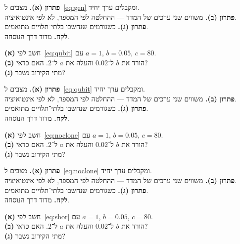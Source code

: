 \begin{keybox}[frametitle={פתרון 15},nobreak=true]
\textbf{פתרון (א).} מצבים ל~\eqref{eq:gen} ומקבלים ערך יחיד.\\[2pt]
\textbf{פתרון (ב).} משווים שני ערכים של המדד — ההחלטה לפי המספר, לא לפי אינטואיציה.\\[2pt]
\textbf{פתרון (ג).} כשגורמים שנחשבו בלתי־תלויים מתואמים.\\[2pt]
\textbf{לקח.} מדוד דרך הנוסחה.
\end{keybox}


\begin{exbox}[frametitle={תרגיל 16 — \en{Bloch}}]
\textbf{(א)} חשב לפי~\eqref{eq:qubit} עם $a=1$, $b=0.05$, $c=80$.\\[3pt]
\textbf{(ב)} הורד את $b$ ל־$0.02$ והעלה את $a$ ל־$2$. האם כדאי?\\[3pt]
\textbf{(ג)} מתי הקירוב נשבר?
\end{exbox}

\begin{keybox}[frametitle={פתרון 16},nobreak=true]
\textbf{פתרון (א).} מצבים ל~\eqref{eq:qubit} ומקבלים ערך יחיד.\\[2pt]
\textbf{פתרון (ב).} משווים שני ערכים של המדד — ההחלטה לפי המספר, לא לפי אינטואיציה.\\[2pt]
\textbf{פתרון (ג).} כשגורמים שנחשבו בלתי־תלויים מתואמים.\\[2pt]
\textbf{לקח.} מדוד דרך הנוסחה.
\end{keybox}


\begin{exbox}[frametitle={תרגיל 17 — \en{no-cloning}}]
\textbf{(א)} חשב לפי~\eqref{eq:noclone} עם $a=1$, $b=0.05$, $c=80$.\\[3pt]
\textbf{(ב)} הורד את $b$ ל־$0.02$ והעלה את $a$ ל־$2$. האם כדאי?\\[3pt]
\textbf{(ג)} מתי הקירוב נשבר?
\end{exbox}

\begin{keybox}[frametitle={פתרון 17},nobreak=true]
\textbf{פתרון (א).} מצבים ל~\eqref{eq:noclone} ומקבלים ערך יחיד.\\[2pt]
\textbf{פתרון (ב).} משווים שני ערכים של המדד — ההחלטה לפי המספר, לא לפי אינטואיציה.\\[2pt]
\textbf{פתרון (ג).} כשגורמים שנחשבו בלתי־תלויים מתואמים.\\[2pt]
\textbf{לקח.} מדוד דרך הנוסחה.
\end{keybox}


\begin{exbox}[frametitle={תרגיל 18 — \en{period}}]
\textbf{(א)} חשב לפי~\eqref{eq:shor} עם $a=1$, $b=0.05$, $c=80$.\\[3pt]
\textbf{(ב)} הורד את $b$ ל־$0.02$ והעלה את $a$ ל־$2$. האם כדאי?\\[3pt]
\textbf{(ג)} מתי הקירוב נשבר?
\end{exbox}

